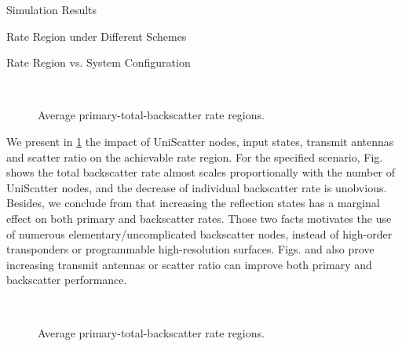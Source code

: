 \documentclass[journal]{IEEEtran}
\begin{document}
\begin{section}{Simulation Results}
\begin{subsection}{Rate Region under Different Schemes}
	\end{subsection}


	\begin{subsection}{Rate Region vs. System Configuration}
		\begin{figure}[!t]
			\centering
			\\
			\caption{Average primary-total-backscatter rate regions.}
			\label{fi:region_config_1}
		\end{figure}

		We present in \ref{fi:region_config_1} the impact of UniScatter nodes, input states, transmit antennas and scatter ratio on the achievable rate region.
		For the specified scenario, Fig.  shows the total backscatter rate almost scales proportionally with the number of UniScatter nodes, and the decrease of individual backscatter rate is unobvious.
		Besides, we conclude from  that increasing the reflection states has a marginal effect on both primary and backscatter rates.
		Those two facts motivates the use of numerous elementary/uncomplicated backscatter nodes, instead of high-order transponders or programmable high-resolution surfaces.
		Figs.  and  also prove increasing transmit antennas or scatter ratio can improve both primary and backscatter performance.

		\begin{figure}[!t]
			\centering
			\\
			\caption{Average primary-total-backscatter rate regions.}
			\label{fi:region_config_2}
		\end{figure}


\end{subsection}
\end{section}
\end{document}
